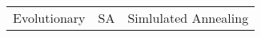 \documentclass[twoside,a4paper,10pt]{article}
\begin{document}
\begin{tabular}{ccc}
Evolutionary & SA & Simlulated Annealing \\ 
\end{tabular}
\end{document}
